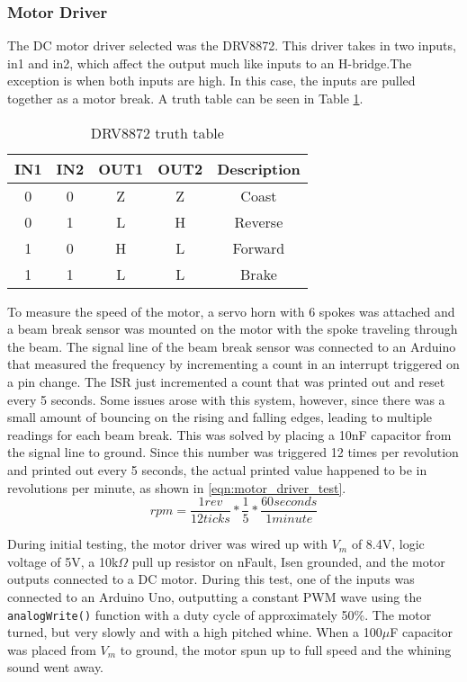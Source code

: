 \subsubsection{Motor Driver}
The DC motor driver selected was the DRV8872. This driver takes in two inputs, in1 and in2, which affect the output much like inputs to an H-bridge.The exception is when both inputs are high. In this case, the inputs are pulled together as a motor break. A truth table can be seen in Table \ref{tbl:drv8872-truth6}.

\begin{table}[H]
	\centering
	\caption{DRV8872 truth table}
	\begin{tabular}{| c | c | c | c| c |}
		\hline
		IN1 & IN2 & OUT1 & OUT2 & Description \\
		\hline
		0 & 0 & Z & Z & Coast \\
		0 & 1 & L & H & Reverse \\
		1 & 0 & H & L & Forward \\
		1 & 1 & L & L & Brake \\
		\hline
	\end{tabular}
	\label{tbl:drv8872-truth6}
\end{table}

\noindent To measure the speed of the motor, a servo horn with 6 spokes was attached and a beam break sensor was mounted on the motor with the spoke traveling through the beam. The signal line of the beam break sensor was connected to an Arduino that measured the frequency by incrementing a count in an interrupt triggered on a pin change. The ISR just incremented a count that was printed out and reset every 5 seconds. Some issues arose with this system, however, since there was a small amount of bouncing on the rising and falling edges, leading to multiple readings for each beam break. This was solved by placing a 10nF capacitor from the signal line to ground. Since this number was triggered 12 times per revolution and printed out every 5 seconds, the actual printed value happened to be in revolutions per minute, as shown in \ref{eqn:motor_driver_test}.
\begin{equation}
rpm = \frac{1 rev}{12 ticks} * \frac{1}{5} * \frac{60 seconds}{1 minute}
\label{eqn:motor_driver_test}
\end{equation}

\noindent During initial testing, the motor driver was wired up with $V_m$ of 8.4V, logic voltage of 5V, a 10k$\Omega$ pull up resistor on nFault, Isen grounded, and the motor outputs connected to a DC motor. During this test, one of the inputs was connected to an Arduino Uno, outputting a constant PWM wave using the \texttt{analogWrite()} function with a duty cycle of approximately 50\%. The motor turned, but very slowly and with a high pitched whine. When a 100$\mu$F capacitor was placed from $V_m$ to ground, the motor spun up to full speed and the whining sound went away.

